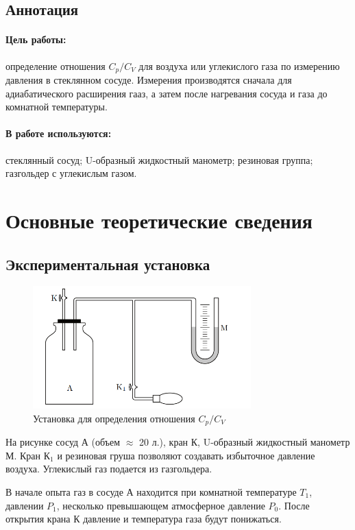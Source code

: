 \documentclass[a4paper,12pt]{article}
\begin{document}
	
	\newpage
    
    \subsection*{Аннотация}
        \paragraph*{Цель работы:} определение отношения $C_p/C_V$ для воздуха или углекислого газа по измерению давления в стеклянном сосуде. Измерения производятся сначала для адиабатического расширения гааз, а затем после нагревания сосуда и газа до комнатной температуры.
        \paragraph*{В работе используются:} стеклянный сосуд; U-образный жидкостный манометр; резиновая группа; газгольдер с углекислым газом.
    \section{Основные теоретические сведения}
    \subsection*{Экспериментальная установка}
        \begin{figure}[H]
            \includegraphics*[width=0.75\textwidth]{ustanovka.png}
            \centering
            \caption{Установка для определения отношения $C_p/C_V$}
        \end{figure}
        На рисунке сосуд А (объем $\approx$ 20 л.), кран К, U-образный жидкостный манометр М. Кран К$_1$ и резиновая груша позволяют создавать избыточное давление воздуха. Углекислый газ подается из газгольдера.

        В начале опыта газ в сосуде А находится при комнатной температуре $T_1$, давлении $P_1$, несколько превышающем атмосферное давление $P_0$. После открытия крана К давление и температура газа будут понижаться.
\end{document}
